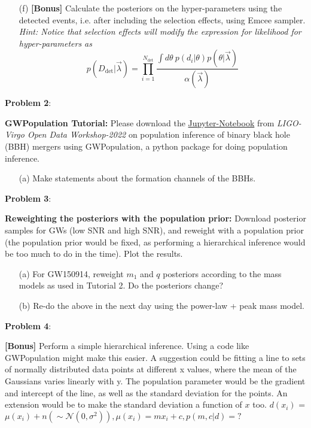 \documentclass{article} %
\newcommand{\question}[2][]{\begin{flushleft}
        \textbf{Problem #1}: %
\end{flushleft}
}
\begin{document}
\begin{enumerate}
    \item[(f)] \textbf{[Bonus]} Calculate the posteriors on the hyper-parameters using the detected events, i.e. after including the selection effects, using Emcee sampler. \textit{Hint: Notice that selection effects will modify the expression for likelihood for hyper-parameters as}
    \begin{equation}
        p(D_{\mathrm{det}}|\Vec{\lambda}) =  \prod_{i=1}^{N_{\mathrm{det}}} \frac{\int d \theta \ p(d_i|\theta) p(\theta|\Vec{\lambda})}{\alpha(\Vec{\lambda})}
    \end{equation}

    \end{enumerate}

    \question[2]{} \textbf{GWPopulation Tutorial:} Please download the \href{https://github.com/gw-odw/odw-2022/blob/main/Tutorials/Advanced_topics/Tuto_A.2_Population_Inference_with_GWPopulation.ipynb}{Jupyter-Notebook} from \textit{LIGO-Virgo Open Data Workshop-2022} on population inference of binary black hole (BBH) mergers using GWPopulation, a python package for doing population inference.
    \begin{enumerate}
        \item[(a)] Make statements about the formation channels of the BBHs. 
    \end{enumerate}
    
    \question[3]{} 
    \textbf{Reweighting the posteriors with the population prior:} Download posterior samples for GWs (low SNR and high SNR), and reweight with a population prior (the population prior would be fixed, as performing a hierarchical inference would be too much to do in the time). Plot the results.
    \begin{enumerate}
        \item[(a)] For GW150914, reweight $m_1$ and $q$ posteriors according to the mass models as used in Tutorial 2. Do the posteriors change?
        \item[(b)] Re-do the above in the next day using the power-law + peak mass model.
    \end{enumerate}

	\question[4]{} \textbf{[Bonus]}
Perform a simple hierarchical inference. Using a code like GWPopulation might make this easier. A suggestion could be fitting a line to sets of normally distributed data points at different x values, where the mean of the Gaussians varies linearly with y. The population parameter would be the gradient and intercept of the line, as well as the standard deviation for the points. An extension would be to make the standard deviation a function of $x$ too. $d(x_i)$ = $\mu(x_i) + n( \sim \mathcal{N}(0, \sigma^2)) , \mu(x_i) = m x_i + c,   p(m,c|d)=?$
\end{document}
